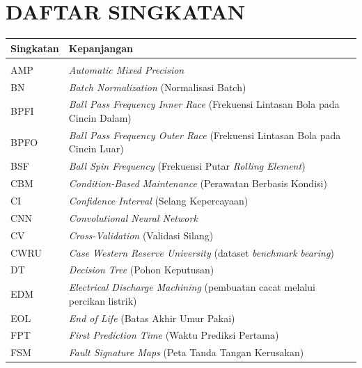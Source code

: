 ﻿%

\chapter*{DAFTAR SINGKATAN}

\begin{singlespace}
\begin{longtable}{@{}p{2.6cm}p{\dimexpr\textwidth-2.6cm-2\tabcolsep\relax}@{}}
\textbf{Singkatan} & \textbf{Kepanjangan} \\[4pt]
\hline
\\[-6pt]
AMP         & \emph{Automatic Mixed Precision} \\
BN          & \emph{Batch Normalization} (Normalisasi Batch) \\
BPFI        & \emph{Ball Pass Frequency Inner Race} (Frekuensi Lintasan Bola pada Cincin Dalam) \\
BPFO        & \emph{Ball Pass Frequency Outer Race} (Frekuensi Lintasan Bola pada Cincin Luar) \\
BSF         & \emph{Ball Spin Frequency} (Frekuensi Putar \emph{Rolling Element}) \\
CBM         & \emph{Condition-Based Maintenance} (Perawatan Berbasis Kondisi) \\
CI          & \emph{Confidence Interval} (Selang Kepercayaan) \\
CNN         & \emph{Convolutional Neural Network} \\
CV          & \emph{Cross-Validation} (Validasi Silang) \\
CWRU        & \emph{Case Western Reserve University} (dataset \emph{benchmark} \emph{bearing}) \\
DT          & \emph{Decision Tree} (Pohon Keputusan) \\
EDM         & \emph{Electrical Discharge Machining} (pembuatan cacat melalui percikan listrik) \\
EOL         & \emph{End of Life} (Batas Akhir Umur Pakai) \\
FPT         & \emph{First Prediction Time} (Waktu Prediksi Pertama) \\
FSM         & \emph{Fault Signature Maps} (Peta Tanda Tangan Kerusakan) \\

\end{longtable}
\end{singlespace}
